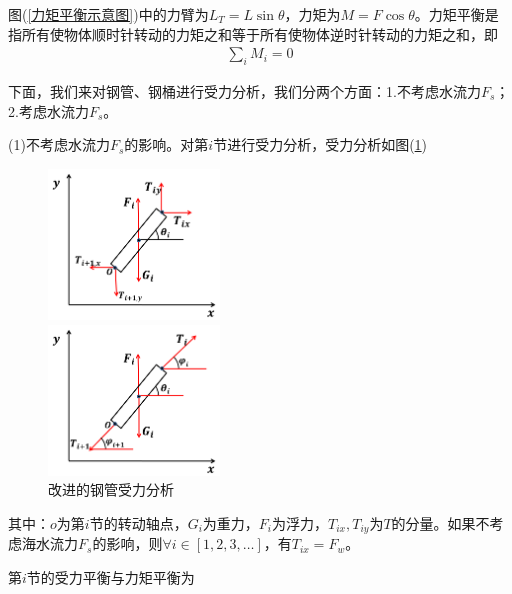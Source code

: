             图(\ref{力矩平衡示意图})中的力臂为$L_T = L\sin \theta$，力矩为$M = F\cos\theta$。力矩平衡是指所有使物体顺时针转动的力矩之和等于所有使物体逆时针转动的力矩之和，即
            \begin{align*}
            \sum_i M_i = 0
            \end{align*}
            \par
            下面，我们来对钢管、钢桶进行受力分析，我们分两个方面：1.不考虑水流力$F_s$；2.考虑水流力$F_s$。
            \par
            (1)不考虑水流力$F_s$的影响。对第$i$节进行受力分析，受力分析如图(\ref{改进的钢管受力分析})
            \begin{figure}[H]
              \centering
              \begin{varwidth}[t]{\textwidth}
                \vspace{0pt}
                \includegraphics[height=4cm]{images/Improved_chart1.jpg}
              \end{varwidth}
              \qquad
              \begin{varwidth}[t]{\textwidth}
                \vspace{0pt}
                \includegraphics[height=4cm]{images/Improved_chart2.jpg}
              \end{varwidth}
            \caption{改进的钢管受力分析}
            \label{改进的钢管受力分析}
            \end{figure}
            其中：$o$为第$i$节的转动轴点，$G_i$为重力，$F_i$为浮力，$T_{ix},T_{iy}$为$T$的分量。如果不考虑海水流力$F_s$的影响，则$\forall i\in [1,2,3,\dots]$，有$T_{ix} = F_w$。
            \par
            第$i$节的受力平衡与力矩平衡为
